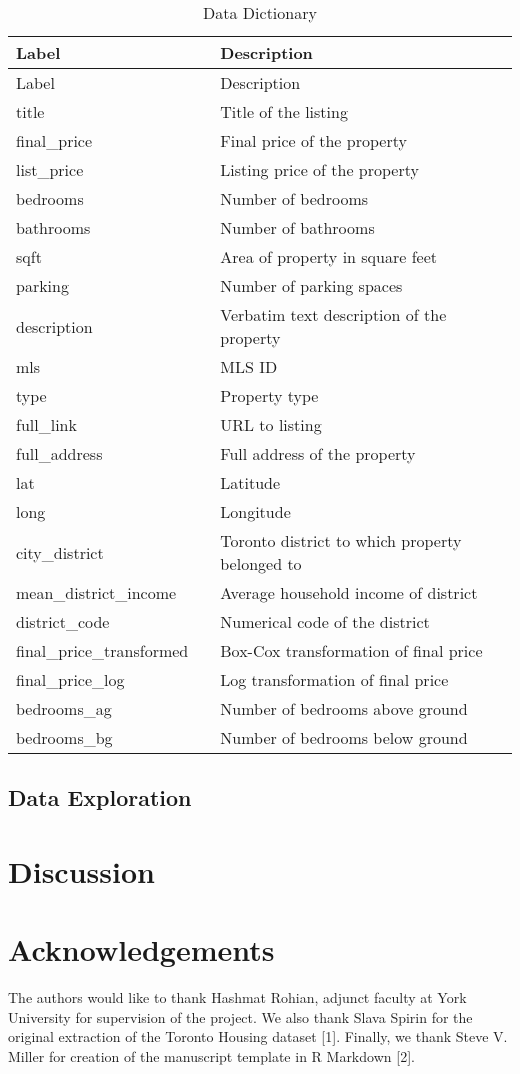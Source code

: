 \documentclass[11pt,]{article}
\begin{document}
\begin{longtable}[]{@{}lll@{}}
\caption{Data Dictionary}\tabularnewline
\toprule
Label & & Description\tabularnewline
\midrule
\endfirsthead
\toprule
Label & & Description\tabularnewline
\midrule
\endhead
title & & Title of the listing\tabularnewline
final\_price & & Final price of the property\tabularnewline
list\_price & & Listing price of the property\tabularnewline
bedrooms & & Number of bedrooms\tabularnewline
bathrooms & & Number of bathrooms\tabularnewline
sqft & & Area of property in square feet\tabularnewline
parking & & Number of parking spaces\tabularnewline
description & & Verbatim text description of the property\tabularnewline
mls & & MLS ID\tabularnewline
type & & Property type\tabularnewline
full\_link & & URL to listing\tabularnewline
full\_address & & Full address of the property\tabularnewline
lat & & Latitude\tabularnewline
long & & Longitude\tabularnewline
city\_district & & Toronto district to which property belonged
to\tabularnewline
mean\_district\_income & & Average household income of
district\tabularnewline
district\_code & & Numerical code of the district\tabularnewline
final\_price\_transformed & & Box-Cox transformation of final
price\tabularnewline
final\_price\_log & & Log transformation of final price\tabularnewline
bedrooms\_ag & & Number of bedrooms above ground\tabularnewline
bedrooms\_bg & & Number of bedrooms below ground\tabularnewline
\bottomrule
\end{longtable}

\hypertarget{data-exploration}{%
\subsection{Data Exploration}\label{data-exploration}}

\hypertarget{discussion}{%
\section{Discussion}\label{discussion}}

\hypertarget{acknowledgements}{%
\section{Acknowledgements}\label{acknowledgements}}

The authors would like to thank Hashmat Rohian, adjunct faculty at York
University for supervision of the project. We also thank Slava Spirin
for the original extraction of the Toronto Housing dataset {[}1{]}.
Finally, we thank Steve V. Miller for creation of the manuscript
template in R Markdown {[}2{]}.
\end{document}
